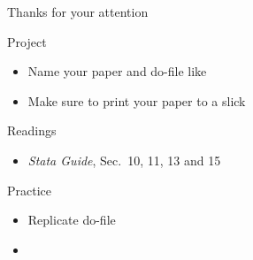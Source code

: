 \documentclass[t]{beamer}
\begin{document}
    \begin{frame}[c]{Thanks for your attention}
    
        \begin{alertblock}{Project}
            \begin{itemize}
                \item Name your paper and do-file like 
                \item Make sure to print your paper to a slick 
            \end{itemize}
        \end{alertblock}
        
        \begin{block}{Readings}
            \begin{itemize}
                \item \emph{Stata Guide}, Sec.~10, 11, 13 and 15
            \end{itemize}
        \end{block}
            
        \begin{exampleblock}{Practice}
            \begin{itemize}
                \item Replicate do-file
                \item {}
            \end{itemize}
        \end{exampleblock}
            
    \end{frame}
    
\end{document}

